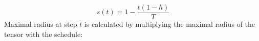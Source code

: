 \begin{equation}
    s(t) = 1 - \frac{t(1-h)}{T}                                                                                                                                                                                                                                                                                                                                                                                                                                                                                                                                                                                                                                                                                                                                                                                                                                                                                                                                                                                                                                                                                                                                                                                                                                                                                                                                                                                                                                                                                                                                                                                                                                                                                                                                                                                                                                                                                                                                                                                                                                                                                                                                                                                                                                                                                                                                                                                                                                                             
\end{equation}
Maximal radius at step $t$ is calculated by 
multiplying the 
maximal radius of the tensor with the schedule:
